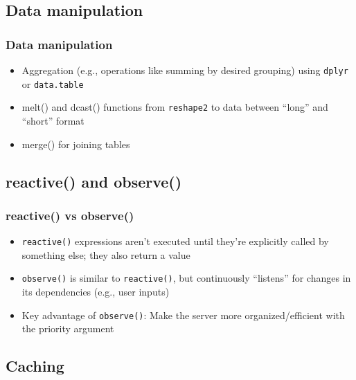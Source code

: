 \documentclass[
	11pt, %
]{beamer}
\begin{document}
\subsection{Data manipulation}

\begin{frame}
	\frametitle{Data manipulation}
	
	\begin{itemize}
			\item Aggregation (e.g., operations like summing by desired grouping) using \texttt{dplyr} or \texttt{data.table}
			\item melt() and dcast() functions from \texttt{reshape2} to \href{https://seananderson.ca/2013/10/19/reshape/}{\color{blue}{transform}} data between ``long” and ``short” format
			\item merge() for joining tables
	\end{itemize}
\end{frame}

\subsection{reactive() and observe()}

\begin{frame}
	\frametitle{reactive() vs observe()}
	
	\begin{itemize}
	\item \texttt{reactive()} expressions aren't executed until they're explicitly called by something else; they also return a value
	\item \texttt{observe()} is similar to \texttt{reactive()}, but continuously ``listens'' for changes in its dependencies (e.g., user inputs)
	\item Key advantage of \texttt{observe()}: Make the server more organized/efficient with the priority argument
	\end{itemize}
	
\end{frame}

\subsection{Caching}
\end{document}
